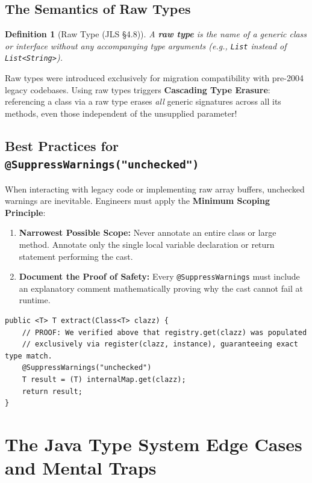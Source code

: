 \documentclass[10pt,journal,compsoc,onecolumn]{IEEEtran}
\newtheorem{definition}[theorem]{Definition}
\begin{document}
\subsection{The Semantics of Raw Types}
\begin{definition}[Raw Type (JLS \S4.8)]
A \textbf{raw type} is the name of a generic class or interface without any accompanying type arguments (e.g., \texttt{List} instead of \texttt{List<String>}).
\end{definition}
Raw types were introduced exclusively for migration compatibility with pre-2004 legacy codebases. Using raw types triggers \textbf{Cascading Type Erasure}: referencing a class via a raw type erases \emph{all} generic signatures across all its methods, even those independent of the unsupplied parameter!

\subsection{Best Practices for \texttt{@SuppressWarnings("unchecked")}}
When interacting with legacy code or implementing raw array buffers, unchecked warnings are inevitable. Engineers must apply the \textbf{Minimum Scoping Principle}:
\begin{enumerate}
    \item \textbf{Narrowest Possible Scope:} Never annotate an entire class or large method. Annotate only the single local variable declaration or return statement performing the cast.
    \item \textbf{Document the Proof of Safety:} Every \texttt{@SuppressWarnings} must include an explanatory comment mathematically proving why the cast cannot fail at runtime.
\end{enumerate}

\begin{lstlisting}[caption={Exemplary Scoped and Documented Unchecked Warning Suppression}]
public <T> T extract(Class<T> clazz) {
    // PROOF: We verified above that registry.get(clazz) was populated
    // exclusively via register(clazz, instance), guaranteeing exact type match.
    @SuppressWarnings("unchecked")
    T result = (T) internalMap.get(clazz);
    return result;
}
\end{lstlisting}

\section{The Java Type System Edge Cases and Mental Traps}
\label{sec:edge_cases}
\end{document}
